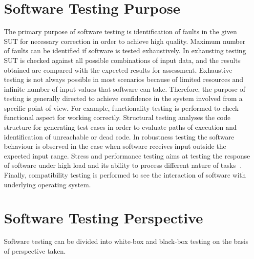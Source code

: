 \section{Software Testing Purpose}
The primary purpose of software testing is identification of faults in the given SUT for necessary correction in order to achieve high quality. Maximum number of faults can be identified if software is tested exhaustively. In exhausting testing SUT is checked against all possible combinations of input data, and the results obtained are compared with the expected results for assessment. Exhaustive testing is not always possible in most scenarios because of limited resources and infinite number of input values that software can take. Therefore, the purpose of testing is generally directed to achieve confidence in the system involved from a specific point of view. For example, functionality testing is performed to check functional aspect for working correctly. Structural testing analyses the code structure for generating test cases in order to evaluate paths of execution and identification of unreachable or dead code. In robustness testing the software behaviour is observed in the case when software receives input outside the expected input range. Stress and performance testing aims at testing the response of software under high load and its ability to process different nature of tasks~\cite{cohen2005robustness}. Finally, compatibility testing is performed to see the interaction of software with underlying operating system.

\section{Software Testing Perspective}
Software testing can be divided into white-box and black-box testing on the basis of perspective taken. 

